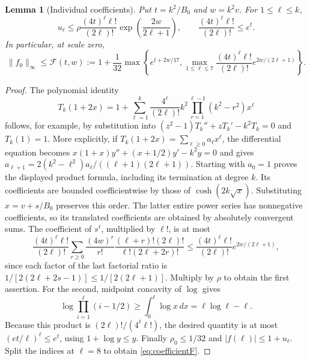 \documentclass[10pt]{article}
\newtheorem{lemma}{Lemma}
\begin{document}
\begin{lemma}[Individual coefficients]\label{lem:coefficient}
Put $t=k^2/B_0$ and $w=k^2v$. For $1\le\ell\le k$,
\begin{equation}\label{eq:individual}
 u_\ell\le\rho\frac{(4t)^\ell\ell!}{(2\ell)!}
                   \exp\left(\frac{2w}{2\ell+1}\right),\qquad
 \frac{(4t)^\ell\ell!}{(2\ell)!}\le e^t.
\end{equation}
In particular, at scale zero,
\begin{equation}\label{eq:coefficientF}
 \|f_0\|_\infty\le\mathcal F(t,w):=
 1+\frac1{32}\max\left\{e^{t+2w/17},
 \max_{1\le\ell\le7}\frac{(4t)^\ell\ell!}{(2\ell)!}e^{2w/(2\ell+1)}\right\}.
\end{equation}
\end{lemma}
\begin{proof}
The polynomial identity
\[
 T_k(1+2x)=1+\sum_{\ell=1}^k
 \frac{4^\ell}{(2\ell)!}k^2\prod_{r=1}^{\ell-1}(k^2-r^2)x^\ell
\]
follows, for example, by substitution into
$(z^2-1)T_k''+zT_k'-k^2T_k=0$ and $T_k(1)=1$.
More explicitly, if $T_k(1+2x)=\sum_{\ell\ge0}a_\ell x^\ell$,
the differential equation becomes
$x(1+x)y''+(x+1/2)y'-k^2y=0$ and gives
$a_{\ell+1}=2(k^2-\ell^2)a_\ell/((\ell+1)(2\ell+1))$.
Starting with $a_0=1$ proves the displayed product formula, including its
termination at degree $k$.
Its coefficients are bounded coefficientwise by those of
$\cosh(2k\sqrt x)$. Substituting $x=v+s/B_0$ preserves this order.
The latter entire power series has nonnegative coefficients, so its
translated coefficients are obtained by absolutely convergent sums.
The coefficient of $s^\ell$, multiplied by $\ell!$, is at most
\[
 \frac{(4t)^\ell\ell!}{(2\ell)!}
 \sum_{r\ge0}\frac{(4w)^r}{r!}
 \frac{(\ell+r)!(2\ell)!}{\ell!(2\ell+2r)!}
 \le\frac{(4t)^\ell\ell!}{(2\ell)!}e^{2w/(2\ell+1)},
\]
since each factor of the last factorial ratio is
$1/[2(2\ell+2s-1)]\le1/[2(2\ell+1)]$.
Multiply by $\rho$ to obtain the first assertion.
For the second, midpoint concavity of $\log$ gives
\[
 \log\prod_{i=1}^\ell(i-1/2)\ge\int_0^\ell\log x\,dx
 =\ell\log\ell-\ell.
\]
Because this product is $(2\ell)!/(4^\ell\ell!)$, the desired quantity
is at most $(et/\ell)^\ell\le e^t$, using $1+\log y\le y$.
Finally $\rho_0\le1/32$ and $|f(\ell)|\le1+u_\ell$.
Split the indices at $\ell=8$ to obtain \eqref{eq:coefficientF}.
\end{proof}
\end{document}

